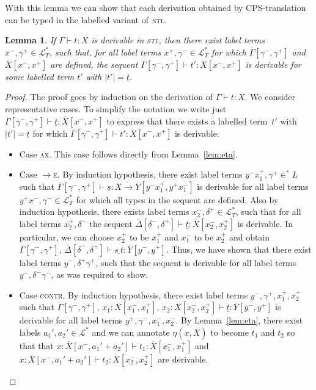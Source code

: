 \documentclass{LMCS}
\theoremstyle{definition}
\theoremstyle{plain}
\newtheorem{lemma}[thm]{Lemma}
\newcommand{\I}[2]{#1 \colon #2}
\newcommand{\SeqTm}[3]{#1 \vdash #2 \colon #3}
\newcommand{\LL}{\mathcal{L}}
\newcommand{\LT}{\mathcal{L}_T}
\newcommand{\cps}[1]{\underline{#1}}
\begin{document}
With this lemma we can show that each derivation obtained by
CPS-translation can be typed in the labelled variant of~\textsc{stl}. 
\begin{lemma}
  \label{lem:cpsstl}
  If\/ $\SeqTm{\Gamma}{t}{X}$ is derivable in \textsc{stl},
  then there exist label terms~$x^-, \gamma^+ \in \LT^*$, such that,
  for all label terms $x^+, \gamma^- \in \LT^*$  
  for which $\overline \Gamma [\gamma^-, \gamma^+]$ and
  $\overline X [x^-, x^+]$ are defined,
  the sequent
  $\SeqTm{\overline \Gamma [\gamma^-, \gamma^+]}{t'}{\overline X [x^-, x^+]}$
  is derivable for some labelled term $t'$ with $|t'|= \cps t$.
\end{lemma}
\begin{proof}
  The proof goes by induction on the derivation of $\SeqTm{\Gamma}{t}{X}$.
  We consider representative cases.
  To simplify the notation we write just
  $\SeqTm{\overline \Gamma [\gamma^-, \gamma^+]}{\cps t}{\overline X [x^-, x^+]}$
  to express that there exists a labelled term~$t'$ with $|t'|= \cps t$ 
  for which
  $\SeqTm{\overline \Gamma [\gamma^-, \gamma^+]}{t'}{\overline X [x^-, x^+]}$
  is derivable.
  \begin{itemize}
    \item Case \textsc{ax}.
      This case follows directly from Lemma~\ref{lem:eta}.
    \item Case \textsc{$\to$e}.
      By induction hypothesis, there exist label terms $y^-x_1^+,\gamma^+ \in ^*L$ 
      such that
      $
         \SeqTm{\overline\Gamma[\gamma^-,\gamma^+]}{\cps s}{\overline{X \to Y}[y^-x_1^+,y^+x_1^-]}
      $
      is derivable for all label terms $y^+x^-, \gamma^- \in \LT^*$ for which
      all types in the sequent are defined.      
      Also by induction hypothesis, there exists label terms $x_2^-,
      \delta^+\in \LT^*$, such that for all label terms $x_2^+,
      \delta^-$ the sequent
      $\SeqTm{\overline\Delta[\delta^-, \delta^+]}{\cps t}{\overline X[x_2^-, x_2^+]}$
      is derivable.
      In particular, we can choose $x_2^+$ to be $x_1^+$ and 
      $x_1^-$ to be $x_2^+$ and obtain 
      $
      \SeqTm{\overline\Gamma[\gamma^-,\gamma^+],\, \overline\Delta[\delta^-,\delta^+]}{\cps{s\ t}}
      {\overline{Y}[y^-,y^+]}
      $.
      Thus, we have shown that there exist label terms $y^-,\delta^+\gamma^+$, such
      that the sequent is derivable for all label terms $y^+,
      \delta^-\gamma^-$, as was required to show.
    \item Case \textsc{contr}.
      By induction hypothesis, there exist label terms $y^-, \gamma^+, x_1^+, x_2^+$
      such that 
      $\SeqTm{\overline \Gamma[\gamma^-,\gamma^+],\,
        \I {x_1} {\overline X[x_1^-, x_1^+]},\,
      \I {x_2} {\overline X[x_2^-, x_2^+]}}{\cps t}{\overline Y[y^-, y^+]}$
      is derivable for all label terms 
      $y^+, \gamma^-, x_1^-, x_2^-$.
      By Lemma~\ref{lem:eta}, there exist labels $a_1', a_2' \in \LL^*$
      and we can annotate $\eta(x, \overline X)$ to become $t_1$
      and $t_2$ so that
      that $\SeqTm{\I x {\overline X[x^-, a_1' + a_2']}}{t_1}{\overline X[x_1^-, x_1^+]}$
      and
      $\SeqTm{\I x {\overline X[x^-, a_1' + a_2']}}{t_2}{\overline X[x_2^-, x_2^+]}$
      are derivable.


\end{itemize}
\end{proof}
\end{document}
